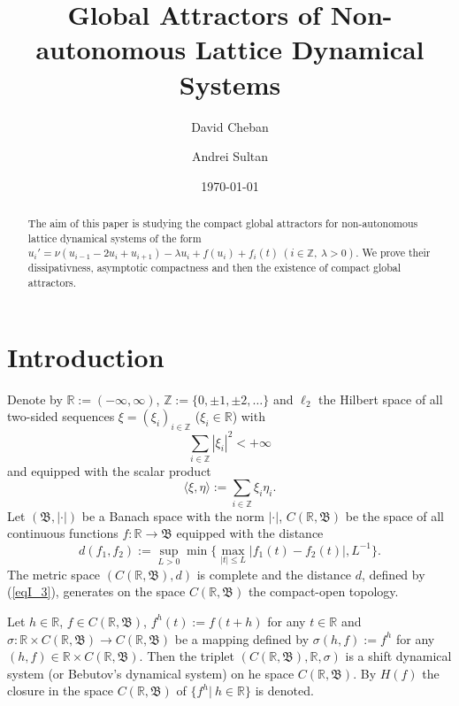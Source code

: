\documentclass{amsart}%
\title{Global Attractors of Non-autonomous Lattice Dynamical Systems}
\author{David Cheban}
\author{Andrei Sultan}
\date{\today}
\begin{document}
\begin{abstract}
The aim of this paper is studying the compact global attractors
for non-autonomous lattice dynamical systems of the form
$u_{i}'=\nu (u_{i-1}-2u_i+u_{i+1})-\lambda u_{i}+f(u_i)+f_{i}(t)\
(i\in \mathbb Z,\ \lambda >0)$. We prove their dissipativness,
asymptotic compactness and then the existence of compact global
attractors.
\end{abstract}

\maketitle



\section{Introduction}\label{Sec1}

Denote by $\mathbb R :=(-\infty,\infty)$, $\mathbb Z :=\{0,\pm
1,\pm 2,\ldots\}$ and $\ell_{2}$ the Hilbert space of all
two-sided sequences $\xi =(\xi_{i})_{i\in \mathbb Z}$ ($\xi_{i}\in
\mathbb R$) with
\begin{equation}\label{eqI_1}
\sum\limits_{i\in \mathbb Z}|\xi_{i}|^{2}<+\infty \nonumber
\end{equation}
and equipped with the scalar product
\begin{equation}\label{eqI_2}
\langle \xi,\eta\rangle :=\sum\limits_{i\in \mathbb
Z}\xi_{i}\eta_{i} .\nonumber
\end{equation}
Let $(\mathfrak B, |\cdot|)$ be a Banach space with the norm
$|\cdot|$, $C(\mathbb R,\mathfrak B)$ be the space of all
continuous functions $f:\mathbb R\to \mathfrak B$ equipped with
the distance
\begin{equation}\label{eqI_3}
d(f_1,f_2):=\sup\limits_{L>0}\min\{\max\limits_{|t|\le
L}|f_{1}(t)-f_{2}(t)|,L^{-1}\}.
\end{equation}
The metric space $(C(\mathbb R,\mathfrak B),d)$ is complete and
the distance $d$, defined by (\ref{eqI_3}), generates on the space
$C(\mathbb R,\mathfrak B)$ the compact-open topology.

Let $h\in \mathbb R$, $f\in C(\mathbb R,\mathfrak B)$,
$f^{h}(t):=f(t+h)$ for any $t\in \mathbb R$ and $\sigma :\mathbb
R\times C(\mathbb R,\mathfrak B)\to C(\mathbb R,\mathfrak B)$ be a
mapping defined by $\sigma(h,f):=f^{h}$ for any $(h,f)\in \mathbb
R\times C(\mathbb R,\mathfrak B)$. Then \cite[Ch.I]{Che_2015} the
triplet $(C(\mathbb R,\mathfrak B),\mathbb R,\sigma)$ is a shift
dynamical system (or Bebutov's dynamical system) on he space
$C(\mathbb R,\mathfrak B)$. By $H(f)$ the closure in the space
$C(\mathbb R,\mathfrak B)$ of $\{f^{h}|\ h\in \mathbb R\}$ is
denoted.
\end{document}
